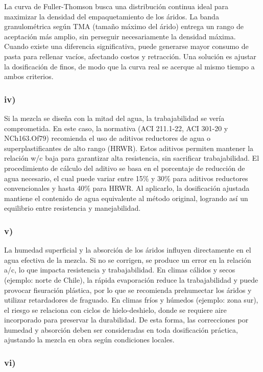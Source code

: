 La curva de Fuller-Thomson busca una distribución continua ideal para maximizar la densidad del empaquetamiento de los áridos. La banda granulométrica según TMA (tamaño máximo del árido) entrega un rango de aceptación más amplio, sin perseguir necesariamente la densidad máxima. Cuando existe una diferencia significativa, puede generarse mayor consumo de pasta para rellenar vacíos, afectando costos y retracción. Una solución es ajustar la dosificación de finos, de modo que la curva real se acerque al mismo tiempo a ambos criterios.

\subsubsection*{iv)}

Si la mezcla se diseña con la mitad del agua, la trabajabilidad se vería comprometida. En este caso, la normativa (ACI 211.1-22, ACI 301-20 y NCh163.Of79) recomienda el uso de aditivos reductores de agua o superplastificantes de alto rango (HRWR). Estos aditivos permiten mantener la relación w/c baja para garantizar alta resistencia, sin sacrificar trabajabilidad. El procedimiento de cálculo del aditivo se basa en el porcentaje de reducción de agua necesario, el cual puede variar entre 15\% y 30\% para aditivos reductores convencionales y hasta 40\% para HRWR. Al aplicarlo, la dosificación ajustada mantiene el contenido de agua equivalente al método original, logrando así un equilibrio entre resistencia y manejabilidad.

\subsubsection*{v)}

La humedad superficial y la absorción de los áridos influyen directamente en el agua efectiva de la mezcla. Si no se corrigen, se produce un error en la relación a/c, lo que impacta resistencia y trabajabilidad. En climas cálidos y secos (ejemplo: norte de Chile), la rápida evaporación reduce la trabajabilidad y puede provocar fisuración plástica, por lo que se recomienda prehumectar los áridos y utilizar retardadores de fraguado. En climas fríos y húmedos (ejemplo: zona sur), el riesgo se relaciona con ciclos de hielo-deshielo, donde se requiere aire incorporado para preservar la durabilidad. De esta forma, las correcciones por humedad y absorción deben ser consideradas en toda dosificación práctica, ajustando la mezcla en obra según condiciones locales.

\subsubsection*{vi)}

